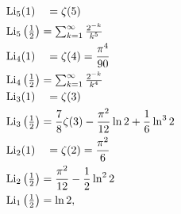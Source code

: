 \begin{align}
& \operatorname{Li}_5(1) \ \ \ =  \zeta(5) \\
& \operatorname{Li}_5\left(\textstyle\frac{1}{2}\right) = \textstyle \sum_{k=1}^\infty {2^{-k} \over k^5} \\
& \operatorname{Li}_4(1) \ \ \ = \zeta(4) = \frac{\pi^4}{90} \\
& \operatorname{Li}_4\left(\textstyle\frac{1}{2}\right) = \textstyle \sum_{k=1}^\infty {2^{-k} \over k^4} \\
& \operatorname{Li}_3(1) \ \ \ =  \zeta(3) \\
& \operatorname{Li}_3\left(\textstyle\frac{1}{2}\right) = \frac{7}{8} \zeta(3) - \frac{\pi^2}{12} \ln 2 + \frac{1}{6} \ln^3 2 \\
& \operatorname{Li}_2(1) \ \ \ =  \zeta(2) = \frac{\pi^2}{6} \\
& \operatorname{Li}_2\left(\textstyle\frac{1}{2}\right) = \frac{\pi^2}{12} - \frac{1}{2} \ln^2 2 \\
& \operatorname{Li}_1\left(\textstyle\frac{1}{2}\right) = \ln2,
\end{align}